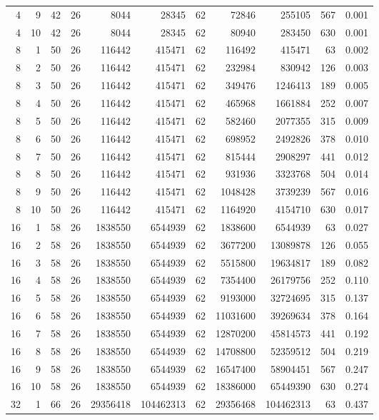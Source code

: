 \begin{table}[t]
\begin{tabularx}{\linewidth}{rrrrrrrrrrr}
4 & 9 & 42 & 26 & 8044 & 28345 & 62 & 72846 & 255105 & 567 & 0.001 \\
4 & 10 & 42 & 26 & 8044 & 28345 & 62 & 80940 & 283450 & 630 & 0.001 \\
8 & 1 & 50 & 26 & 116442 & 415471 & 62 & 116492 & 415471 & 63 & 0.002 \\
8 & 2 & 50 & 26 & 116442 & 415471 & 62 & 232984 & 830942 & 126 & 0.003 \\
8 & 3 & 50 & 26 & 116442 & 415471 & 62 & 349476 & 1246413 & 189 & 0.005 \\
8 & 4 & 50 & 26 & 116442 & 415471 & 62 & 465968 & 1661884 & 252 & 0.007 \\
8 & 5 & 50 & 26 & 116442 & 415471 & 62 & 582460 & 2077355 & 315 & 0.009 \\
8 & 6 & 50 & 26 & 116442 & 415471 & 62 & 698952 & 2492826 & 378 & 0.010 \\
8 & 7 & 50 & 26 & 116442 & 415471 & 62 & 815444 & 2908297 & 441 & 0.012 \\
8 & 8 & 50 & 26 & 116442 & 415471 & 62 & 931936 & 3323768 & 504 & 0.014 \\
8 & 9 & 50 & 26 & 116442 & 415471 & 62 & 1048428 & 3739239 & 567 & 0.016 \\
8 & 10 & 50 & 26 & 116442 & 415471 & 62 & 1164920 & 4154710 & 630 & 0.017 \\
16 & 1 & 58 & 26 & 1838550 & 6544939 & 62 & 1838600 & 6544939 & 63 & 0.027 \\
16 & 2 & 58 & 26 & 1838550 & 6544939 & 62 & 3677200 & 13089878 & 126 & 0.055 \\
16 & 3 & 58 & 26 & 1838550 & 6544939 & 62 & 5515800 & 19634817 & 189 & 0.082 \\
16 & 4 & 58 & 26 & 1838550 & 6544939 & 62 & 7354400 & 26179756 & 252 & 0.110 \\
16 & 5 & 58 & 26 & 1838550 & 6544939 & 62 & 9193000 & 32724695 & 315 & 0.137 \\
16 & 6 & 58 & 26 & 1838550 & 6544939 & 62 & 11031600 & 39269634 & 378 & 0.164 \\
16 & 7 & 58 & 26 & 1838550 & 6544939 & 62 & 12870200 & 45814573 & 441 & 0.192 \\
16 & 8 & 58 & 26 & 1838550 & 6544939 & 62 & 14708800 & 52359512 & 504 & 0.219 \\
16 & 9 & 58 & 26 & 1838550 & 6544939 & 62 & 16547400 & 58904451 & 567 & 0.247 \\
16 & 10 & 58 & 26 & 1838550 & 6544939 & 62 & 18386000 & 65449390 & 630 & 0.274 \\
32 & 1 & 66 & 26 & 29356418 & 104462313 & 62 & 29356468 & 104462313 & 63 & 0.437 \\

\end{tabularx}
\end{table}
